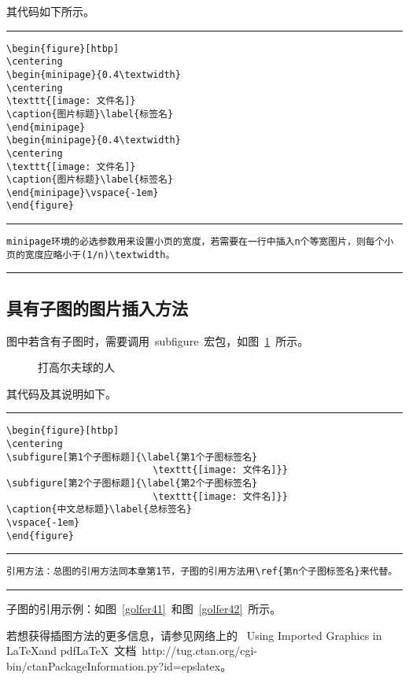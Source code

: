 其代码如下所示。
\vspace{1em}\noindent\hrule
\begin{lstlisting}
\begin{figure}[htbp]
\centering
\begin{minipage}{0.4\textwidth}
\centering
\texttt{[image: 文件名]}
\caption{图片标题}\label{标签名}
\end{minipage}
\begin{minipage}{0.4\textwidth}
\centering
\texttt{[image: 文件名]}
\caption{图片标题}\label{标签名}
\end{minipage}\vspace{-1em}
\end{figure}
\end{lstlisting}
\noindent\hrule
\begin{lstlisting}
minipage环境的必选参数用来设置小页的宽度，若需要在一行中插入n个等宽图片，则每个小页的宽度应略小于(1/n)\textwidth。
\end{lstlisting}
\noindent\hrule

\subsection{具有子图的图片插入方法}

图中若含有子图时，需要调用~subfigure~宏包，如图~\ref{golfer4}~所示。

\begin{figure}[htbp]
\centering
{}
\caption{打高尔夫球的人}\label{golfer4}\vspace{-1em}
\end{figure}

其代码及其说明如下。
\vspace{1em}\noindent\hrule
\begin{lstlisting}
\begin{figure}[htbp]
\centering
\subfigure[第1个子图标题]{\label{第1个子图标签名}
                          \texttt{[image: 文件名]}}
\subfigure[第2个子图标题]{\label{第2个子图标签名}
                          \texttt{[image: 文件名]}}
\caption{中文总标题}\label{总标签名}
\vspace{-1em}
\end{figure}
\end{lstlisting}
\noindent\hrule
\begin{lstlisting}
引用方法：总图的引用方法同本章第1节，子图的引用方法用\ref{第n个子图标签名}来代替。
\end{lstlisting}
\noindent\hrule\vspace{1em}

子图的引用示例：如图~\ref{golfer41}~和图~\ref{golfer42}~所示。

若想获得插图方法的更多信息，请参见网络上的~
Using Imported Graphics in \LaTeX and pdf\LaTeX~文档~http://tug.ctan.org/cgi-bin/ctanPackageInformation.py?id=epslatex。 
